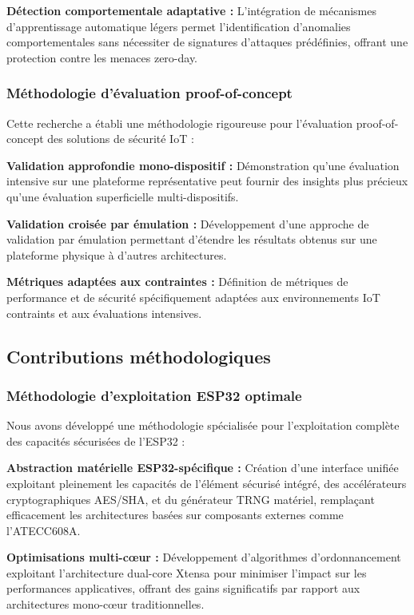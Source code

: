 \textbf{Détection comportementale adaptative :} L'intégration de mécanismes d'apprentissage automatique légers permet l'identification d'anomalies comportementales sans nécessiter de signatures d'attaques prédéfinies, offrant une protection contre les menaces zero-day.

\subsubsection{Méthodologie d'évaluation proof-of-concept}

Cette recherche a établi une méthodologie rigoureuse pour l'évaluation proof-of-concept des solutions de sécurité IoT :

\textbf{Validation approfondie mono-dispositif :} Démonstration qu'une évaluation intensive sur une plateforme représentative peut fournir des insights plus précieux qu'une évaluation superficielle multi-dispositifs.

\textbf{Validation croisée par émulation :} Développement d'une approche de validation par émulation permettant d'étendre les résultats obtenus sur une plateforme physique à d'autres architectures.

\textbf{Métriques adaptées aux contraintes :} Définition de métriques de performance et de sécurité spécifiquement adaptées aux environnements IoT contraints et aux évaluations intensives.

\subsection{Contributions méthodologiques}

\subsubsection{Méthodologie d'exploitation ESP32 optimale}

Nous avons développé une méthodologie spécialisée pour l'exploitation complète des capacités sécurisées de l'ESP32 :

\textbf{Abstraction matérielle ESP32-spécifique :} Création d'une interface unifiée exploitant pleinement les capacités de l'élément sécurisé intégré, des accélérateurs cryptographiques AES/SHA, et du générateur TRNG matériel, remplaçant efficacement les architectures basées sur composants externes comme l'ATECC608A.

\textbf{Optimisations multi-cœur :} Développement d'algorithmes d'ordonnancement exploitant l'architecture dual-core Xtensa pour minimiser l'impact sur les performances applicatives, offrant des gains significatifs par rapport aux architectures mono-cœur traditionnelles.

